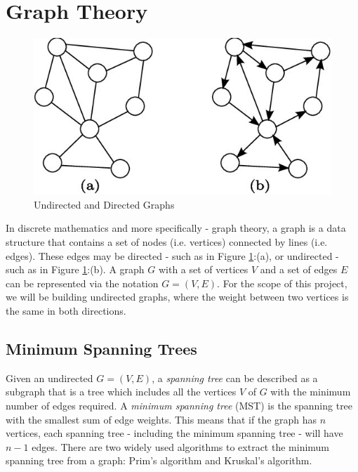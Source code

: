 \documentclass[paper=a4,fontsize=11pt]{report}	%
\begin{document}
\section{Graph Theory}
\begin{figure}[H]
\centering
\includegraphics[scale=1.5]{graph-example}
\caption{Undirected and Directed Graphs}
\label{fig:graph.example}
\end{figure}
In discrete mathematics and more specifically - graph theory, a graph is a data structure that contains a set of nodes (i.e. vertices) connected by lines (i.e. edges).  These edges may be directed - such as in Figure \ref{fig:graph.example}:(a), or undirected - such as in Figure \ref{fig:graph.example}:(b). A graph $G$ with a set of vertices $V$ and a set of edges $E$ can be represented via the notation $G = (V,E)$. For the scope of this project,  we will be building undirected graphs, where the weight between two vertices is the same in both directions.
\subsection{Minimum Spanning Trees}
Given an undirected $G = (V,E)$,  a \textit{spanning tree} can be described as a subgraph that is a tree which includes all the vertices $V$ of $G$ with the minimum number of edges required. A \textit{minimum spanning tree} (MST) is the spanning tree with the smallest sum of edge weights.  This means that if the graph has $n$ vertices, each spanning tree - including the minimum spanning tree - will have $n-1$ edges. There are two widely used algorithms to extract the minimum spanning tree from a graph: Prim's algorithm and Kruskal's algorithm.
\end{document}
